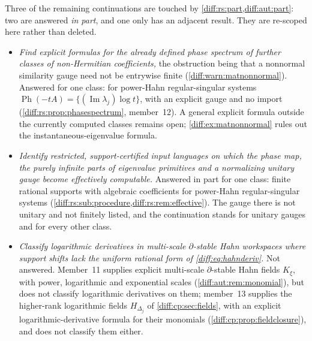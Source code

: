 \documentclass[11pt,letterpaper]{article}
\numberwithin{equation}{section}
\theoremstyle{definition}
\theoremstyle{remark}
\newcommand{\der}{\partial}
\newcommand{\Imm}{\operatorname{Im}}
\newcommand{\Ph}{\operatorname{Ph}}
\begin{document}
Three of the remaining continuations are touched by \cref{diff:rs:part,diff:aut:part}: two
are answered \emph{in part}, and one only has an adjacent result. They are
re-scoped here rather than deleted.
\begin{itemize}[leftmargin=1.6em]
\item \emph{Find explicit formulas for the already defined phase spectrum of further
classes of non-Hermitian coefficients,} the obstruction being that a nonnormal
similarity gauge need not be entrywise finite (\cref{diff:warn:matnonnormal}).
Answered for one class: for power-Hahn regular-singular systems
$\Ph(-tA)=\{(\Imm\lambda_{j})\log t\}$, with an explicit gauge and no import
(\cref{diff:rs:prop:phasespectrum}, member~12). A general explicit formula outside the currently computed classes remains
open; \cref{diff:ex:matnonnormal} rules out the instantaneous-eigenvalue formula.
\item \emph{Identify restricted, support-certified input languages on which the
phase map, the purely infinite parts of eigenvalue primitives and a normalizing
unitary gauge become effectively computable.} Answered in part for one class:
finite rational supports with algebraic coefficients for power-Hahn
regular-singular systems
(\cref{diff:rs:sub:procedure,diff:rs:rem:effective}). The gauge there is not
unitary and not finitely listed, and the continuation stands for unitary gauges
and for every other class.
\item \emph{Classify logarithmic derivatives in multi-scale $\der$-stable Hahn
workspaces where support shifts lack the uniform rational form of
\cref{diff:eq:hahnderiv}.} Not answered. Member~11 supplies explicit multi-scale
$\der$-stable Hahn fields $K_{\xi}$, with power, logarithmic and exponential
scales (\cref{diff:aut:rem:monomial}), but does not classify logarithmic
derivatives on them; member~13 supplies the higher-rank logarithmic fields
$H_{\Delta_{j}}$ of \cref{diff:cp:sec:fields}, with an explicit
logarithmic-derivative formula for their monomials
(\cref{diff:cp:prop:fieldclosure}), and does not classify them either.
\end{itemize}
\end{document}
